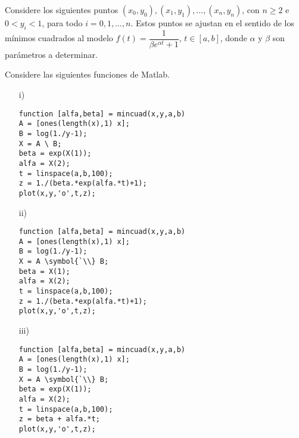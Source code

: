 \begin{pregunta}
\puntaje{}
\begin{cuerpo}
Considere los siguientes puntos $(x_0,y_0), (x_1,y_1), \ldots, (x_n,y_n)$, con $n\geq2$ e $0<y_i<1$, para todo $i=0,1,\ldots, n$. Estos puntos se ajustan en el sentido de los m\'inimos cuadrados al modelo $f(t)=\dfrac{1}{\beta e^{\alpha t}+1}$, $t\in [a,b]$, donde $\alpha$ y $\beta$ son par\'ametros a determinar.

Considere las siguientes funciones de Matlab.\medskip

\hspace{-1.25in}
\begin{minipage}{1.15\textwidth}
\begin{multicols}{2}
\begin{itemize}
\item[i)] \hspace{0.025\textwidth}
\begin{minipage}{0.4\textwidth}
\begin{lstlisting}
function [alfa,beta] = mincuad(x,y,a,b)
A = [ones(length(x),1) x];
B = log(1./y-1);
X = A \ B;
beta = exp(X(1));
alfa = X(2);
t = linspace(a,b,100);
z = 1./(beta.*exp(alfa.*t)+1);
plot(x,y,'o',t,z);
\end{lstlisting}
\end{minipage}

\item[ii)] \hspace{0.025\textwidth}
\begin{minipage}{0.4\textwidth}
\begin{lstlisting}
function [alfa,beta] = mincuad(x,y,a,b)
A = [ones(length(x),1) x];
B = log(1./y-1);
X = A \symbol{`\\} B;
beta = X(1);
alfa = X(2);
t = linspace(a,b,100);
z = 1./(beta.*exp(alfa.*t)+1);
plot(x,y,'o',t,z);
\end{lstlisting}
\end{minipage}

\item[iii)] \hspace{0.025\textwidth}
\begin{minipage}{0.4\textwidth}
\begin{lstlisting}
function [alfa,beta] = mincuad(x,y,a,b)
A = [ones(length(x),1) x];
B = log(1./y-1);
X = A \symbol{`\\} B;
beta = exp(X(1));
alfa = X(2);
t = linspace(a,b,100);
z = beta + alfa.*t;
plot(x,y,'o',t,z);
\end{lstlisting}
\end{minipage}


\end{itemize}
\end{multicols}
\end{minipage}
\end{cuerpo}
\end{pregunta}
